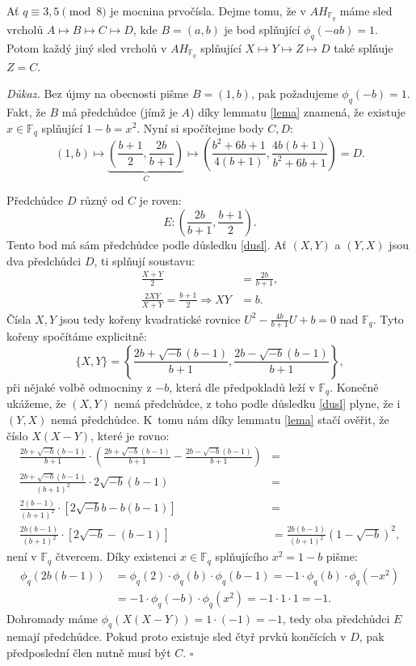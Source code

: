 \documentclass[12pt]{report}
\begin{document}
\begin{lemma}\label{smol}
Ať $q \equiv 3,5 \pmod{8}$ je mocnina prvočísla. Dejme tomu, že v $AH_{\mathbb{F}_q}$ máme sled vrcholů $A \longmapsto B \longmapsto C \longmapsto D$, kde $B = (a,b)$ je bod splňující $\phi_q(-ab) = 1$. Potom každý jiný sled vrcholů v $AH_{\mathbb{F}_q}$ splňující $X \longmapsto Y \longmapsto Z \longmapsto D$ také splňuje $Z = C$.
\end{lemma}
\noindent \textit{Důkaz.} Bez újmy na obecnosti pišme $B = (1,b)$, pak požadujeme $\phi_q(-b)=1$. Fakt, že $B$ má předchůdce (jímž je $A$) díky lemmatu \ref{lema} znamená, že existuje $x \in \mathbb{F}_q$ splňující $1-b = x^2$. Nyní si spočítejme body $C,D$:
$$ (1,b) \longmapsto \underbrace{\left(\frac{b+1}{2}, \frac{2b}{b+1} \right)}_{C} \longmapsto \left( \frac{b^2+6b+1}{4(b+1)}, \frac{4b(b+1)}{b^2+6b+1} \right) = D. $$

Předchůdce $D$ různý od $C$ je roven:
$$E : \left(\frac{2b}{b+1}, \frac{b+1}{2} \right).$$
Tento bod má sám předchůdce podle důsledku \ref{dusl}. Ať $(X,Y)$ a $(Y,X)$ jsou dva předchůdci $D$, ti splňují soustavu:
\begin{align*}
\frac{X+Y}{2} &= \frac{2b}{b+1},\\
\frac{2XY}{X+Y} =  \frac{b+1}{2} \Rightarrow XY &= b.
\end{align*}
Čísla $X,Y$ jsou tedy kořeny kvadratické rovnice $U^2 - \frac{4b}{b+1} U + b = 0$ nad $\mathbb{F}_q$. Tyto kořeny spočítáme explicitně:
$$\lbrace X,Y \rbrace = \left\lbrace \frac{2b + \sqrt{-b}(b-1)}{b+1},\frac{2b - \sqrt{-b}(b-1)}{b+1} \right\rbrace,$$
při nějaké volbě odmocniny z $-b$, která dle předpokladů leží v $\mathbb{F}_q$. Konečně ukážeme, že $(X,Y)$ nemá předchůdce, z toho podle důsledku \ref{dusl} plyne, že i $(Y,X)$ nemá předchůdce. K~tomu nám díky lemmatu \ref{lema} stačí ověřit, že číslo $X(X-Y)$, které je rovno:
\begin{align*}
\frac{2b + \sqrt{-b}(b-1)}{b+1} \cdot \left( \frac{2b + \sqrt{-b}(b-1)}{b+1} - \frac{2b - \sqrt{-b}(b-1)}{b+1} \right) &=\\
\frac{2b + \sqrt{-b}(b-1)}{(b+1)^2} \cdot 2 \sqrt{-b}(b-1)&=\\
\frac{2 (b-1)}{(b+1)^2} \cdot [2 \sqrt{-b} b - b(b-1)] &=\\
\frac{2 b(b-1)}{(b+1)^2} \cdot [2 \sqrt{-b}-(b-1)] &= \frac{2 b(b-1)}{(b+1)^2} (1-\sqrt{-b})^2,
\end{align*}
není v $\mathbb{F}_q$ čtvercem. Díky existenci $x \in \mathbb{F}_q$ splňujícího $x^2 = 1-b$ pišme:
\begin{align*}
\phi_q( 2 b (b-1)) &= \phi_q (2) \cdot \phi_q(b) \cdot \phi_q(b-1) = -1 \cdot \phi_q(b) \cdot \phi_q(-x^2)\\
&= -1 \cdot \phi_q (-b) \cdot \phi_q(x^2) = -1 \cdot 1 \cdot 1 = -1.
\end{align*}
Dohromady máme $\phi_q (X(X-Y)) = 1 \cdot (-1) = -1$, tedy oba předchůdci $E$ nemají předchůdce. Pokud proto existuje sled čtyř prvků končících v $D$, pak předposlední člen nutně musí být $C$. \hfill $\square$
\end{document}
